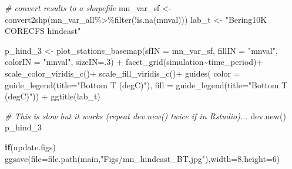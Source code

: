 \documentclass[
]{article}
\newenvironment{Shaded}{\begin{snugshade}}{\end{snugshade}}
\newcommand{\AttributeTok}[1]{\textcolor[rgb]{0.77,0.63,0.00}{#1}}
\newcommand{\CommentTok}[1]{\textcolor[rgb]{0.56,0.35,0.01}{\textit{#1}}}
\newcommand{\ControlFlowTok}[1]{\textcolor[rgb]{0.13,0.29,0.53}{\textbf{#1}}}
\newcommand{\DecValTok}[1]{\textcolor[rgb]{0.00,0.00,0.81}{#1}}
\newcommand{\FunctionTok}[1]{\textcolor[rgb]{0.00,0.00,0.00}{#1}}
\newcommand{\NormalTok}[1]{#1}
\newcommand{\OtherTok}[1]{\textcolor[rgb]{0.56,0.35,0.01}{#1}}
\newcommand{\SpecialCharTok}[1]{\textcolor[rgb]{0.00,0.00,0.00}{#1}}
\newcommand{\StringTok}[1]{\textcolor[rgb]{0.31,0.60,0.02}{#1}}
\begin{document}
\begin{Shaded}
\begin{Highlighting}[]
    \CommentTok{\# convert results to a shapefile}
\NormalTok{    mn\_var\_sf  }\OtherTok{\textless{}{-}} \FunctionTok{convert2shp}\NormalTok{(mn\_var\_all}\SpecialCharTok{\%\textgreater{}\%}\FunctionTok{filter}\NormalTok{(}\SpecialCharTok{!}\FunctionTok{is.na}\NormalTok{(mnval)))}
\NormalTok{    lab\_t      }\OtherTok{\textless{}{-}} \StringTok{"Bering10K CORECFS hindcast"}
    
\NormalTok{    p\_hind\_3         }\OtherTok{\textless{}{-}} \FunctionTok{plot\_stations\_basemap}\NormalTok{(}\AttributeTok{sfIN =}\NormalTok{ mn\_var\_sf,}
                                \AttributeTok{fillIN =} \StringTok{"mnval"}\NormalTok{,}
                                \AttributeTok{colorIN =} \StringTok{"mnval"}\NormalTok{,}
                                \AttributeTok{sizeIN=}\NormalTok{.}\DecValTok{3}\NormalTok{) }\SpecialCharTok{+}
      \FunctionTok{facet\_grid}\NormalTok{(simulation}\SpecialCharTok{\textasciitilde{}}\NormalTok{time\_period)}\SpecialCharTok{+}
      \FunctionTok{scale\_color\_viridis\_c}\NormalTok{()}\SpecialCharTok{+}
      \FunctionTok{scale\_fill\_viridis\_c}\NormalTok{()}\SpecialCharTok{+}
      \FunctionTok{guides}\NormalTok{(}
        \AttributeTok{color =}  \FunctionTok{guide\_legend}\NormalTok{(}\AttributeTok{title=}\StringTok{"Bottom T (degC)"}\NormalTok{),}
        \AttributeTok{fill  =}  \FunctionTok{guide\_legend}\NormalTok{(}\AttributeTok{title=}\StringTok{"Bottom T (degC)"}\NormalTok{)) }\SpecialCharTok{+}
      \FunctionTok{ggtitle}\NormalTok{(lab\_t)}
   
    \CommentTok{\# This is slow but it works (repeat dev.new() twice if in Rstudio)...}
    \FunctionTok{dev.new}\NormalTok{()}
\NormalTok{    p\_hind\_3}
    
    \ControlFlowTok{if}\NormalTok{(update.figs)  }
      \FunctionTok{ggsave}\NormalTok{(}\AttributeTok{file=}\FunctionTok{file.path}\NormalTok{(main,}\StringTok{"Figs/mn\_hindcast\_BT.jpg"}\NormalTok{),}\AttributeTok{width=}\DecValTok{8}\NormalTok{,}\AttributeTok{height=}\DecValTok{6}\NormalTok{)}
\end{Highlighting}
\end{Shaded}
\end{document}

